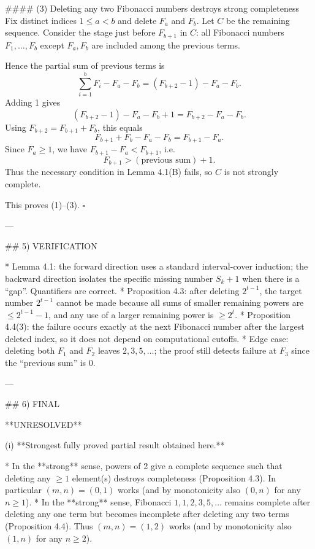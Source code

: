 #### (3) Deleting any two Fibonacci numbers destroys strong completeness
Fix distinct indices \(1\le a<b\) and delete \(F_a\) and \(F_b\). Let \(C\) be the remaining sequence.
Consider the stage just before \(F_{b+1}\) in \(C\): all Fibonacci numbers \(F_1,\dots,F_b\) except
\(F_a,F_b\) are included among the previous terms.

Hence the partial sum of previous terms is
\[
\sum_{i=1}^b F_i - F_a - F_b = (F_{b+2}-1) - F_a - F_b.
\]
Adding 1 gives
\[
(F_{b+2}-1)-F_a-F_b +1 = F_{b+2}-F_a-F_b.
\]
Using \(F_{b+2}=F_{b+1}+F_b\), this equals
\[
F_{b+1}+F_b -F_a -F_b = F_{b+1}-F_a.
\]
Since \(F_a\ge 1\), we have \(F_{b+1}-F_a < F_{b+1}\), i.e.
\[
F_{b+1} > (\text{previous sum})+1.
\]
Thus the necessary condition in Lemma 4.1(B) fails, so \(C\) is not strongly complete.

This proves (1)–(3). \(\square\)

---

## 5) VERIFICATION

* Lemma 4.1: the forward direction uses a standard interval-cover induction; the backward direction
  isolates the specific missing number \(S_k+1\) when there is a “gap”. Quantifiers are correct.
* Proposition 4.3: after deleting \(2^{t-1}\), the target number \(2^{t-1}\) cannot be made because all
  sums of smaller remaining powers are \(\le 2^{t-1}-1\), and any use of a larger remaining power is
  \(\ge 2^t\).
* Proposition 4.4(3): the failure occurs exactly at the next Fibonacci number after the largest
  deleted index, so it does not depend on computational cutoffs.
* Edge case: deleting both \(F_1\) and \(F_2\) leaves \(2,3,5,\dots\); the proof still detects failure at
  \(F_3\) since the “previous sum” is 0.

---

## 6) FINAL

**UNRESOLVED**

(i) **Strongest fully proved partial result obtained here.**

* In the **strong** sense, powers of 2 give a complete sequence such that deleting any \(\ge 1\)
  element(s) destroys completeness (Proposition 4.3). In particular \((m,n)=(0,1)\) works (and by
  monotonicity also \((0,n)\) for any \(n\ge 1\)).
* In the **strong** sense, Fibonacci \(1,1,2,3,5,\dots\) remains complete after deleting any one term
  but becomes incomplete after deleting any two terms (Proposition 4.4). Thus \((m,n)=(1,2)\) works
  (and by monotonicity also \((1,n)\) for any \(n\ge 2\)).


